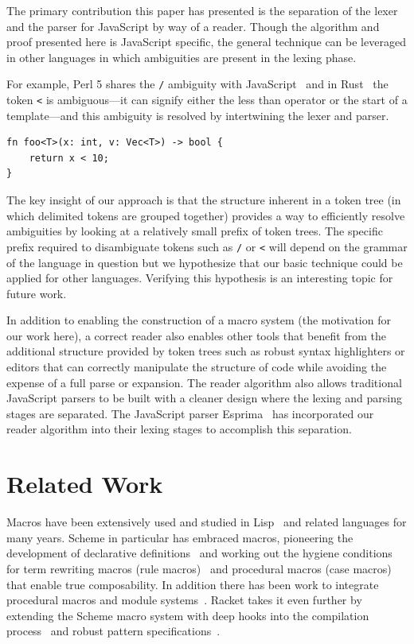 \documentclass[9pt]{sigplanconf}
\begin{document}
The primary contribution this paper has presented is the separation of
the lexer and the parser for JavaScript by way of a reader. Though the
algorithm and proof presented here is JavaScript specific, the general
technique can be leveraged in other languages in which ambiguities are
present in the lexing phase.

For example, Perl 5 shares the \verb!/! ambiguity with
JavaScript~\cite{parsingperl} and in Rust~\cite{rustlang} the token
\verb!<! is ambiguous---it can signify either the less than operator
or the start of a template---and this ambiguity is resolved by
intertwining the lexer and parser.

\begin{lstlisting}
fn foo<T>(x: int, v: Vec<T>) -> bool {
    return x < 10;
}
\end{lstlisting}

The key insight of our approach is that the structure inherent in a
token tree (in which delimited tokens are grouped together) provides a
way to efficiently resolve ambiguities by looking at a relatively
small prefix of token trees. The specific prefix required to
disambiguate tokens such as \verb!/! or \verb!<! will depend
on the grammar of the language in question but we hypothesize that our
basic technique could be applied for other languages.
Verifying this hypothesis is an interesting topic for future work.

In addition to enabling the construction of a macro system (the
motivation for our work here), a correct reader also enables other
tools that benefit from the additional structure provided by token
trees such as robust syntax highlighters or editors that can correctly
manipulate the structure of code while avoiding the expense of a full
parse or expansion. The reader algorithm also allows traditional
JavaScript parsers to be built with a cleaner design where the lexing
and parsing stages are separated. The JavaScript parser
Esprima~\cite{esprima} has incorporated our reader algorithm into
their lexing stages to accomplish this separation.


\section{Related Work}
\label{sec:related}

Macros have been extensively used and studied in Lisp~\cite{Foderaro1983,Pitman1980} and related languages for many years. Scheme in particular has embraced macros, pioneering the development of declarative definitions~\cite{Kohlbecker1987} and working out the hygiene conditions for term rewriting macros (rule macros)~\cite{Clinger1991} and procedural macros (case macros)~\cite{Hieb1992} that enable true composability.
In addition there has been work to integrate procedural macros and module systems~\cite{Flatt2002,Ghuloum2007}.
Racket takes it even further by extending the Scheme macro system with deep hooks into the compilation process~\cite{Flatt2012,Tobin-Hochstadt2011} and robust pattern specifications~\cite{Culpepper2010a}.
\end{document}
